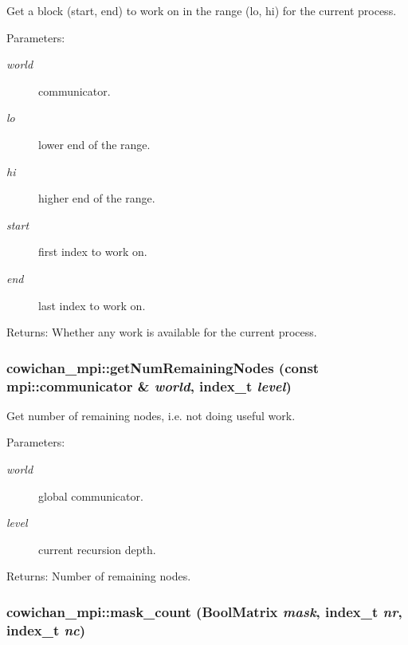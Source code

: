 Get a block (start, end) to work on in the range (lo, hi) for the current process. \begin{Desc}
\item[Parameters:]
\begin{description}
\item[{\em world}]communicator. \item[{\em lo}]lower end of the range. \item[{\em hi}]higher end of the range. \item[{\em start}]first index to work on. \item[{\em end}]last index to work on. \end{description}
\end{Desc}
\begin{Desc}
\item[Returns:]Whether any work is available for the current process. \end{Desc}
\hypertarget{namespacecowichan__mpi_7f82c459ad086060228b2bd8100bf9c7}{
\subsubsection[{getNumRemainingNodes}]{ cowichan\_\-mpi::getNumRemainingNodes (const mpi::communicator \& {\em world}, \/  {\bf index\_\-t} {\em level})}}
\label{namespacecowichan__mpi_7f82c459ad086060228b2bd8100bf9c7}


Get number of remaining nodes, i.e. not doing useful work. \begin{Desc}
\item[Parameters:]
\begin{description}
\item[{\em world}]global communicator. \item[{\em level}]current recursion depth. \end{description}
\end{Desc}
\begin{Desc}
\item[Returns:]Number of remaining nodes. \end{Desc}
\hypertarget{namespacecowichan__mpi_a54004a105356573d4bac92e1b234aa2}{
\subsubsection[{mask\_\-count}]{ cowichan\_\-mpi::mask\_\-count ({\bf BoolMatrix} {\em mask}, \/  {\bf index\_\-t} {\em nr}, \/  {\bf index\_\-t} {\em nc})}}
\label{namespacecowichan__mpi_a54004a105356573d4bac92e1b234aa2}


